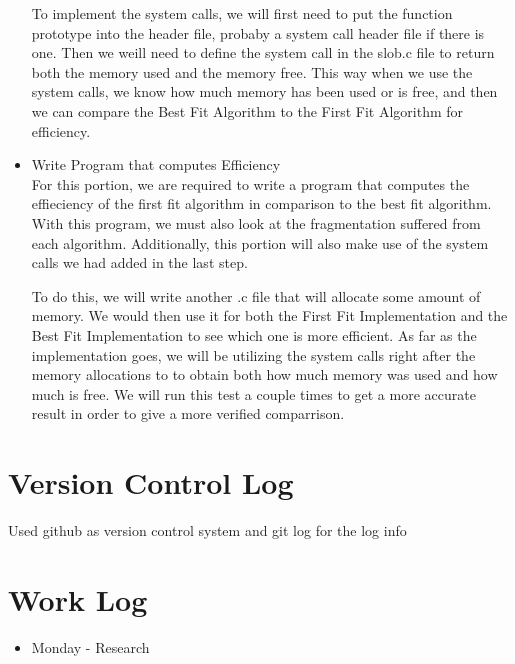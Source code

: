 \documentclass[10pt, onecolumn, letterpaper, draftclsnofoot]{IEEEtran}
\begin{document}
\begin{itemize}
To implement the system calls, we will first need to put the function prototype into the header file, probaby a system call header file if there is one. Then we weill need to define the system call in the slob.c file to return both the memory used and the memory free. This way when we use the system calls, we know how much memory has been used or is free, and then we can compare the Best Fit Algorithm to the First Fit Algorithm for efficiency. \newline

\item{Write Program that computes Efficiency}\\
\noindent For this portion, we are required to write a program that computes the effieciency of the first fit algorithm in comparison to the best fit algorithm. With this program, we must also look at the fragmentation suffered from each algorithm. Additionally, this portion will also make use of the system calls we had added in the last step. \newline

\noindent To do this, we will write another .c file that will allocate some amount of memory. We would then use it for both the First Fit Implementation and the Best Fit Implementation to see which one is more efficient. As far as the implementation goes, we will be utilizing the system calls right after the memory allocations to to obtain both how much memory was used and how much is free. We will run this test a couple times to get a more accurate result in order to give a more verified comparrison. \newline
\end{itemize}



\section{Version Control Log}
Used github as version control system and git log for the log info \par


\section{Work Log}
\begin{itemize}
\item{Monday - Research} \\

\end{itemize}
\end{document}
